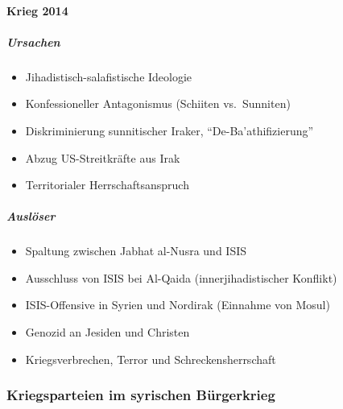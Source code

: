 {}\documentclass[a4paper]{article}
\providecommand{\tightlist}{\setlength{\itemsep}{1mm}\setlength{\parskip}{1mm}}
\begin{document}
\paragraph{Krieg 2014}\label{krieg-2014}

\subparagraph{Ursachen}\label{ursachen}

\begin{itemize}
	\tightlist
	\item
	      Jihadistisch-salafistische Ideologie
	\item
	      Konfessioneller Antagonismus (Schiiten vs.~Sunniten)
	\item
	      Diskriminierung sunnitischer Iraker, ``De-Ba'athifizierung''
	\item
	      Abzug US-Streitkräfte aus Irak
	\item
	      Territorialer Herrschaftsanspruch
\end{itemize}

\subparagraph{Auslöser}\label{ausluxf6ser}

\begin{itemize}
	\tightlist
	\item
	      Spaltung zwischen Jabhat al-Nusra und ISIS
	\item
	      Ausschluss von ISIS bei Al-Qaida (innerjihadistischer Konflikt)
	\item
	      ISIS-Offensive in Syrien und Nordirak (Einnahme von Mosul)
	\item
	      Genozid an Jesiden und Christen
	\item
	      Kriegsverbrechen, Terror und Schreckensherrschaft
\end{itemize}

\subsubsection{Kriegsparteien im syrischen
	Bürgerkrieg}\label{kriegsparteien-im-syrischen-buxfcrgerkrieg}
\end{document}
